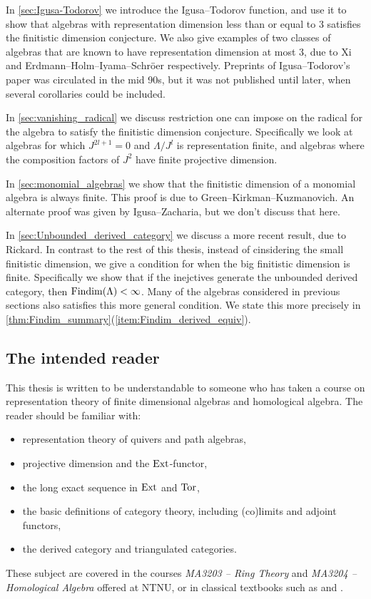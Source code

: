 In \cref{sec:Igusa-Todorov} we introduce the Igusa--Todorov function, and use it to show that algebras with representation dimension less than or equal to 3 satisfies the finitistic dimension conjecture. We also give examples of two classes of algebras that are known to have representation dimension at most 3, due to Xi and Erdmann--Holm--Iyama--Schröer respectively\cite{Xi02,EHIS04}. Preprints of Igusa--Todorov's paper\cite{IgTo05} was circulated in the mid 90s, but it was not published until later, when several corollaries could be included.

In \cref{sec:vanishing_radical} we discuss restriction one can impose on the radical for the algebra to satisfy the finitistic dimension conjecture. Specifically we look at algebras for which $J^{2l+1}=0$ and $\Lambda/J^l$ is representation finite, and algebras where the composition factors of $J^2$ have finite projective dimension.

In \cref{sec:monomial_algebras} we show that the finitistic dimension of a monomial algebra is always finite. This proof is due to Green--Kirkman--Kuzmanovich\cite{GKK91}. An alternate proof was given by Igusa--Zacharia\cite{IgZa90}, but we don't discuss that here.

In \cref{sec:Unbounded_derived_category} we discuss a more recent result, due to Rickard\cite{Rick19}. In contrast to the rest of this thesis, instead of cinsidering the small finitistic dimension, we give a condition for when the big finitistic dimension is finite. Specifically we show that if the inejctives generate the unbounded derived category, then $\operatorname{Findim}(\Lambda) < \infty$. Many of the algebras considered in previous sections also satisfies this more general condition. We state this more precisely in \cref{thm:Findim_summary}(\ref{item:Findim_derived_equiv}).

\subsection*{The intended reader}
This thesis is written to be understandable to someone who has taken a course on representation theory of finite dimensional algebras and homological algebra. The reader should be familiar with: 
\renewcommand\labelitemi{---}
\begin{itemize}
  \item representation theory of quivers and path algebras,
  \item projective dimension and the $\operatorname{Ext}$-functor,
  \item the long exact sequence in $\operatorname{Ext}$ and $\operatorname{Tor}$,
  \item the basic definitions of category theory, including (co)limits and adjoint functors,
  \item the derived category and triangulated categories.
\end{itemize}
These subject are covered in the courses \textit{MA3203 -- Ring Theory} and \textit{MA3204 -- Homological Algebra} offered at NTNU, or in classical textbooks such as \cite{ARS97} and \cite{Wei94}.